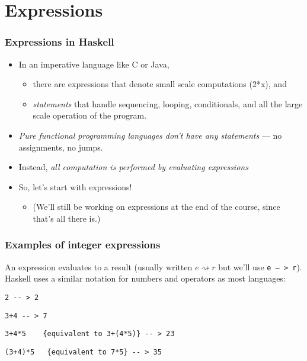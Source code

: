 \documentclass{beamer}
\begin{document}
\section{Expressions}

\begin{frame}
\frametitle{Expressions in Haskell}

\begin{itemize}
\item In an imperative language like C or Java,
  \begin{itemize}
  \item there are expressions that denote small scale computations
    (2*x), and
  \item  \emph{statements} that handle sequencing, looping,
    conditionals, and all the large scale operation of the program.
  \end{itemize}
\item \emph{Pure functional programming languages don't have any statements} --- no
  assignments, no jumps.
\item Instead, \emph{all computation is performed by evaluating
    expressions}
\item So, let's start with expressions!
  \begin{itemize}
  \item (We'll still be working on expressions at the end of the
    course, since that's all there is.)
  \end{itemize}
\end{itemize}

\end{frame}

\begin{frame}[fragile]
\frametitle{Examples of integer expressions}

An expression evaluates to a result (usually written $e \rightsquigarrow r$ but we'll use \texttt{e -- > r}).  Haskell uses a similar notation for numbers and operators as most languages:

\begin{verbatim}
2 -- > 2
\end{verbatim}

\begin{verbatim}
3+4 -- > 7
\end{verbatim}

\begin{verbatim}
3+4*5    {equivalent to 3+(4*5)} -- > 23
\end{verbatim}

\begin{verbatim}
(3+4)*5   {equivalent to 7*5} -- > 35    
\end{verbatim}

\end{frame}
\end{document}

